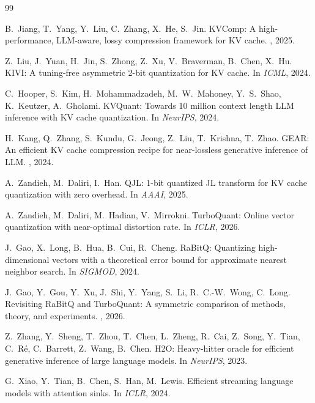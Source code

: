 \documentclass{article}
\theoremstyle{definition}
\theoremstyle{remark}
\begin{document}
{\small

\begin{thebibliography}{99}

B.~Jiang, T.~Yang, Y.~Liu, C.~Zhang, X.~He, S.~Jin.
\newblock KVComp: A high-performance, LLM-aware, lossy compression
framework for KV cache.
, 2025.

Z.~Liu, J.~Yuan, H.~Jin, S.~Zhong, Z.~Xu, V.~Braverman, B.~Chen, X.~Hu.
\newblock KIVI: A tuning-free asymmetric 2-bit quantization for KV
cache.
\newblock In {\em ICML}, 2024.

C.~Hooper, S.~Kim, H.~Mohammadzadeh, M.~W.~Mahoney, Y.~S.~Shao,
K.~Keutzer, A.~Gholami.
\newblock KVQuant: Towards 10 million context length LLM inference
with KV cache quantization.
\newblock In {\em NeurIPS}, 2024.

H.~Kang, Q.~Zhang, S.~Kundu, G.~Jeong, Z.~Liu, T.~Krishna, T.~Zhao.
\newblock GEAR: An efficient KV cache compression recipe for
near-lossless generative inference of LLM.
, 2024.

A.~Zandieh, M.~Daliri, I.~Han.
\newblock QJL: 1-bit quantized JL transform for KV cache quantization
with zero overhead.
\newblock In {\em AAAI}, 2025.

A.~Zandieh, M.~Daliri, M.~Hadian, V.~Mirrokni.
\newblock TurboQuant: Online vector quantization with near-optimal
distortion rate.
\newblock In {\em ICLR}, 2026.

J.~Gao, X.~Long, B.~Hua, B.~Cui, R.~Cheng.
\newblock RaBitQ: Quantizing high-dimensional vectors with a
theoretical error bound for approximate nearest neighbor search.
\newblock In {\em SIGMOD}, 2024.

J.~Gao, Y.~Gou, Y.~Xu, J.~Shi, Y.~Yang, S.~Li, R.~C.-W.~Wong, C.~Long.
\newblock Revisiting RaBitQ and TurboQuant: A symmetric comparison of
methods, theory, and experiments.
, 2026.

Z.~Zhang, Y.~Sheng, T.~Zhou, T.~Chen, L.~Zheng, R.~Cai, Z.~Song,
Y.~Tian, C.~R\'e, C.~Barrett, Z.~Wang, B.~Chen.
\newblock H2O: Heavy-hitter oracle for efficient generative inference
of large language models.
\newblock In {\em NeurIPS}, 2023.

G.~Xiao, Y.~Tian, B.~Chen, S.~Han, M.~Lewis.
\newblock Efficient streaming language models with attention sinks.
\newblock In {\em ICLR}, 2024.


\end{thebibliography}}
\end{document}
